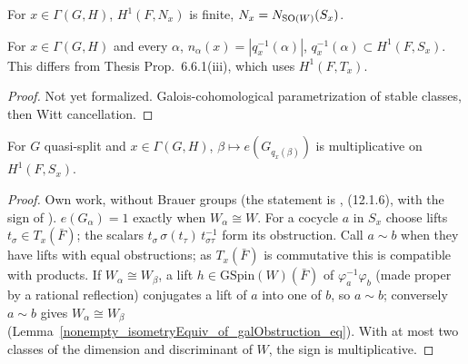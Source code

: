 \begin{literature}[Finiteness of $H^1(F,N_x)$]
\label{LIT-finite_H1_normalizerBar}
\leanok
{}
For $x\in\Gamma(G,H)$, $H^1(F,N_x)$ is finite, $N_x=N_{\mathrm{SO}(W)}(S_x)$.

\end{literature}

\begin{lemma}
\label{n_alpha_eq_card_twistIdx}
\leanok
{}
For $x\in\Gamma(G,H)$ and every $\alpha$, $n_\alpha(x)=|q_x^{-1}(\alpha)|$, $q_x^{-1}(\alpha)\subset H^1(F,S_x)$.
This differs from Thesis Prop.~6.6.1(iii), which uses $H^1(F,T_x)$.
\end{lemma}
\begin{proof}
Not yet formalized. Galois-cohomological parametrization of stable classes, then Witt cancellation.
\end{proof}

\begin{theorem}
\label{kottwitzSign_twistIdx_mul}
\leanok
{}
For $G$ quasi-split and $x\in\Gamma(G,H)$, $\beta\mapsto e(G_{q_x(\beta)})$ is multiplicative on $H^1(F,S_x)$.
\end{theorem}
\begin{proof}
\leanok
{}
Own work, without Brauer groups (the statement is \cite{BP}, (12.1.6), with the sign of \cite{Kot83}).
$e(G_\alpha)=1$ exactly when $W_\alpha\cong W$. For a cocycle $a$ in $S_x$ choose lifts $t_\sigma\in T_x(\bar F)$;
the scalars $t_\sigma\,\sigma(t_\tau)\,t_{\sigma\tau}^{-1}$ form its obstruction. Call $a\sim b$ when they have lifts with
equal obstructions; as $T_x(\bar F)$ is commutative this is compatible with products. If $W_\alpha\cong W_\beta$, a lift
$h\in\mathrm{GSpin}(W)(\bar F)$ of $\varphi_a^{-1}\varphi_b$ (made proper by a rational reflection) conjugates a lift of $a$
into one of $b$, so $a\sim b$; conversely $a\sim b$ gives $W_\alpha\cong W_\beta$
(Lemma~\ref{nonempty_isometryEquiv_of_galObstruction_eq}). With at most two classes of the dimension and discriminant
of $W$, the sign is multiplicative.
\end{proof}

